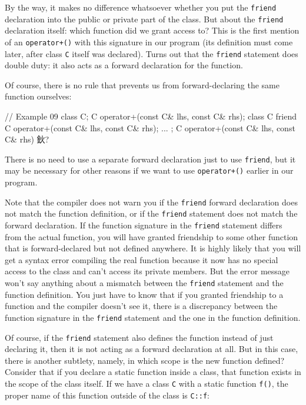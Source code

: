 By the way, it makes no difference whatsoever whether you put the \texttt{friend} declaration into the public or private part of the class. But about the \texttt{friend} declaration itself: which function did we grant access to? This is the first mention of an \texttt{operator+()} with this signature in our program (its definition must come later, after class \texttt{C} itself was declared). Turns out that the \texttt{friend} statement does double duty: it also acts as a forward declaration for the function.

Of course, there is no rule that prevents us from forward-declaring the same function ourselves:

\begin{code}
// Example 09
class C;
C operator+(const C& lhs, const C& rhs);
class C {
  friend C operator+(const C& lhs, const C& rhs);
  ...
};
C operator+(const C& lhs, const C& rhs) { 鈥?}
\end{code}

There is no need to use a separate forward declaration just to use \texttt{friend}, but it may be necessary for other reasons if we want to use \texttt{operator+()} earlier in our program.

Note that the compiler does not warn you if the \texttt{friend} forward declaration does not match the function definition, or if the \texttt{friend} statement does not match the forward declaration. If the function signature in the \texttt{friend} statement differs from the actual function, you will have granted friendship to some other function that is forward-declared but not defined anywhere. It is highly likely that you will get a syntax error compiling the real function because it now has no special access to the class and can't access its private members. But the error message won't say anything about a mismatch between the \texttt{friend} statement and the function definition. You just have to know that if you granted friendship to a function and the compiler doesn't see it, there is a discrepancy between the function signature in the \texttt{friend} statement and the one in the function definition.

Of course, if the \texttt{friend} statement also defines the function instead of just declaring it, then it is not acting as a forward declaration at all. But in this case, there is another subtlety, namely, in which scope is the new function defined? Consider that if you declare a static function inside a class, that function exists in the scope of the class itself. If we have a class \texttt{C} with a static function \texttt{f()}, the proper name of this function outside of the class is \texttt{C::f}:

